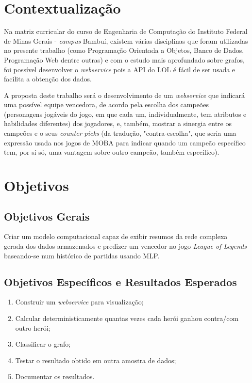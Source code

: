 \section{Contextualização}
Na matriz curricular do curso de Engenharia de Computação do Instituto Federal de Minas Gerais - \textit{campus} Bambuí, existem várias disciplinas que foram utilizadas no presente trabalho (como Programação Orientada a Objetos, Banco de Dados, Programação Web dentre outras) e com o estudo mais aprofundado sobre grafos, foi possível desenvolver o \textit{webservice} pois a API do LOL é fácil de ser usada e facilita a obtenção dos dados.


A proposta deste trabalho será o desenvolvimento de um \textit{webservice} que indicará uma possível equipe vencedora, de acordo pela escolha dos campeões (personagens jogáveis do jogo, em que cada um, individualmente, tem atributos e habilidades diferentes) dos jogadores, e, também, mostrar a sinergia entre os campeões e o seus \textit{counter picks} (da tradução, "contra-escolha", que seria uma expressão usada nos jogos de MOBA para indicar quando um campeão específico tem, por sí só, uma vantagem sobre outro campeão, também específico).

\section{Objetivos}
\subsection{Objetivos Gerais}
Criar um modelo computacional capaz de exibir resumos da rede complexa gerada dos dados armazenados e predizer um vencedor no jogo \textit{League of Legends} baseando-se num histórico de partidas usando MLP.

\subsection{Objetivos Específicos e Resultados Esperados}

\begin{enumerate}
\item Construir um \textit{webservice} para visualização;
\item Calcular deterministicamente quantas vezes cada herói ganhou contra/com outro herói;
\item Classificar o grafo;
\item Testar o resultado obtido em outra amostra de dados;
\item Documentar os resultados.

\end{enumerate}

